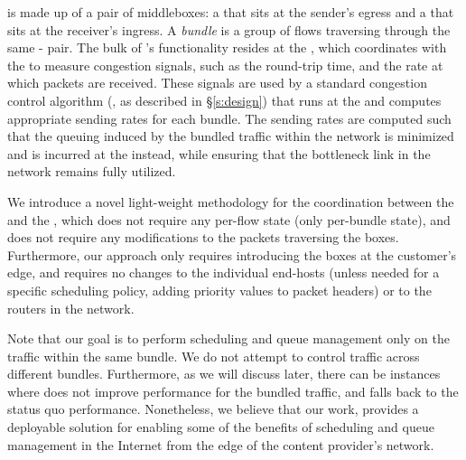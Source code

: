  \name is made up of a pair of middleboxes: a \emph{\inbox} that sits at the sender's egress and a \emph{\outbox} that sits at the receiver's ingress. A \emph{bundle} is a group of flows traversing through the same \inbox{}-\outbox{} pair. The bulk of \name's functionality resides at the \inbox, which coordinates with the \outbox to measure congestion signals, such as the round-trip time, and the rate at which packets are received. These signals are used by a standard congestion control algorithm (, as described in \S\ref{s:design}) that runs at the \inbox and computes appropriate sending rates for each bundle. The sending rates are computed such that the queuing induced by the bundled traffic within the network is minimized and is incurred at the \inbox instead, while ensuring that the bottleneck link in the network remains fully utilized. 
 
 We introduce a novel light-weight methodology for the coordination between the \inbox and the \outbox, which does not require any per-flow state (only per-bundle state), and does not require any modifications to the packets traversing the \name boxes. Furthermore, our approach only requires introducing the \name boxes at the customer's edge, and requires no changes to the individual end-hosts (unless needed for a specific scheduling policy, \eg adding priority values to packet headers) or to the routers in the network. 
 
 Note that our goal is to perform scheduling and queue management only on the traffic within the same bundle. We do not attempt to control traffic across different bundles. Furthermore, as we will discuss later, there can be instances where \name does not improve performance for the bundled traffic, and falls back to the status quo performance. Nonetheless, we believe that our work, provides a deployable solution for enabling some of the benefits of scheduling and queue management in the Internet from the edge of the content provider's network.
 


